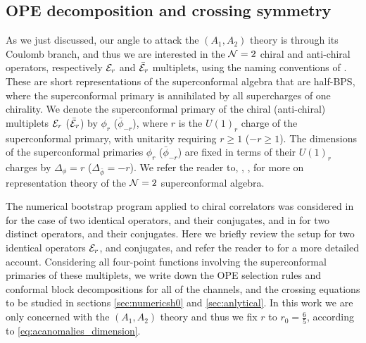 
\subsection{OPE decomposition and crossing symmetry}

As we just discussed, our angle to attack the $(A_1,A_2)$ theory is through its Coulomb branch, and thus we are interested in the  ${\mathcal{N}}=2$ chiral and anti-chiral operators, respectively ${\mathcal{E}}_{r}$ and $\bar{{\mathcal{E}}}_{r}$ multiplets, using the naming conventions of \cite{Dolan:2002zh}. 
These are short representations of the superconformal algebra that are half-BPS, where the superconformal primary  is annihilated by all supercharges of one chirality. We denote the superconformal primary of the chiral (anti-chiral) multiplets ${\mathcal{E}}_{r}$  ($\bar{{\mathcal{E}}}_{r}$) by  $\phi_{r}$ ($\bar{\phi}_{-r}$), where $r$ is the $U(1)_r$ charge of the superconformal primary, with unitarity requiring $r \geqslant 1$ ($-r \geqslant 1$).
The dimensions of the superconformal primaries $\phi_{r}$ ($\bar{\phi}_{-r}$) are fixed in terms of their $U(1)_r$ charges by $\Delta_\phi= r$ ($\Delta_{\bar{\phi}}=-r$). We refer the reader to, \eg, \cite{Dolan:2002zh}, for more on representation theory of the ${\mathcal{N}}=2$ superconformal algebra.


The numerical bootstrap program applied to chiral correlators was considered in \cite{Beem:2014zpa,Lemos:2015awa} for the case of two identical operators, and their conjugates, and in \cite{Lemos:2015awa} for two distinct operators, and their conjugates.
Here we briefly review the setup for two identical operators ${\mathcal{E}}_{r}$, and conjugates, and refer the reader to  \cite{Beem:2014zpa,Lemos:2015awa} for a more detailed account.
Considering all four-point functions involving the superconformal primaries of these multiplets, we write down the OPE selection rules and conformal block decompositions for all of the channels, and the crossing equations to be studied in sections \ref{sec:numericsh0} and \ref{sec:anlytical}. 
In this work we are only concerned with the $(A_1,A_2)$ theory and thus we fix $r$ to $r_0=\frac65$, according to \eqref{eq:acanomalies_dimension}.



